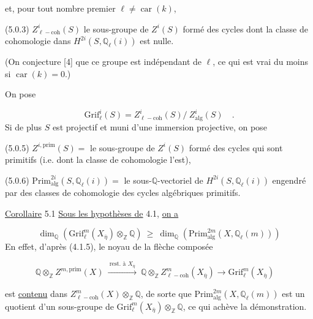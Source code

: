 et, pour tout nombre premier  $\ell \neq \operatorname{car}(k)$,

(5.0.3)   $Z^i_{\ell-\mathrm{coh}}(S)$  le sous-groupe de  $Z^i(S)$  formé des cycles dont la classe de cohomologie dans  $H^{2i}(S,\mathbb{Q}_\ell(i))$  est nulle.

(On conjecture [4] que ce groupe est indépendant de $\ell$, ce qui est vrai du moins si $\operatorname{car}(k)=0$.)

On pose

\begin{equation}\tag{5.0.4}
\mathrm{Grif}^i_\ell(S) = Z^i_{\ell-\mathrm{coh}}(S)/\ Z^i_{\mathrm{alg}}(S) \quad .
\end{equation}
Si de plus $S$ est projectif et muni d'une immersion projective, on pose

(5.0.5)   $Z^{i,\mathrm{prim}}(S) =$ le sous-groupe de  $Z^i(S)$  formé des cycles qui sont primitifs (i.e. dont la classe de cohomologie l'est),

(5.0.6)   $\mathrm{Prim}^{2i}_{\mathrm{alg}}(S,\mathbb{Q}_\ell(i)) =$ le sous-$\mathbb{Q}$-vectoriel de  $H^{2i}(S,\mathbb{Q}_\ell(i))$ engendré par des classes de cohomologie des cycles algébriques primitifs.

\underline{Corollaire} 5.1    \underline{Sous les hypothèses de}  4.1, \underline{on a}

\begin{equation}\tag{5.1.1}
\dim_{\mathbb{Q}}(\mathrm{Grif}^m_\ell(X_{\overline{\eta}})\otimes_{\mathbb{Z}}\mathbb{Q}) \ \geq \ \dim_{\mathbb Q}(\mathrm{Prim}^{2m}_{\mathrm{alg}}(X,\mathbb{Q}_\ell(m)))
\end{equation}
En effet, d'après (4.1.5), le noyau de la flèche composée

\begin{equation*}
\mathbb{Q}\otimes_{\mathbb{Z}}Z^{m,\mathrm{prim}}(X) \ \xrightarrow{\ \text{rest. à } X_{\overline{\eta}}\ }\ \mathbb{Q} \otimes_{\mathbb{Z}}Z^m_{\ell-\mathrm{coh}}(X_{\overline{\eta}}) \longrightarrow \mathrm{Grif}^m_\ell(X_{\overline{\eta}}) \quad 
\end{equation*}


 est \underline{contenu} dans $Z^m_{\ell-\mathrm{coh}}(X) \otimes_{\mathbb{Z}} \mathbb{Q}$, de sorte que $\mathrm{Prim}^{2m}_{\mathrm{alg}}(X,\mathbb{Q}_{\ell}(m))$ est un quotient d'un sous-groupe de $\mathrm{Grif}^m_\ell(X_{\overline{\eta}}) \otimes_{\mathbb{Z}} \mathbb{Q}$, ce qui achève la démonstration.


